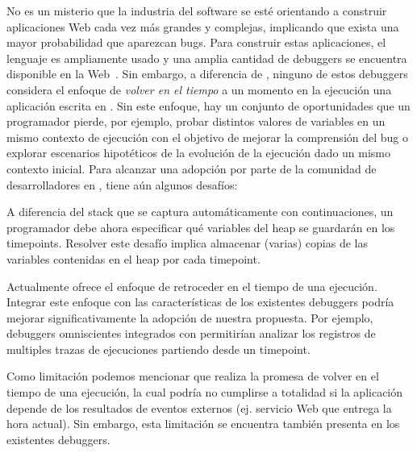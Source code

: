 \documentclass[conference]{IEEEtran}
\begin{document}
No es un misterio que la industria del software se est\'e orientando a construir aplicaciones Web cada vez m\'as grandes y complejas, implicando que exista una mayor probabilidad que aparezcan bugs. Para construir estas aplicaciones, el lenguaje \javascript es ampliamente usado y una amplia cantidad de debuggers se encuentra disponible en la Web~\cite{bartonOdvarko:www2011,jsbin,nodejsInspector,sessionstack,raygun,trackjs,azar:2016,barrAl:fse2016}. Sin embargo, a diferencia de \deloreanjs, ninguno de estos debuggers considera el enfoque de {\em volver en el tiempo} a un momento en la ejecuci\'on una aplicaci\'on escrita en \javascript. Sin este enfoque, hay un conjunto de oportunidades que un programador pierde, por ejemplo, probar distintos valores de variables en un mismo contexto de ejecuci\'on con el objetivo de mejorar la comprensi\'on del bug o explorar escenarios hipot\'eticos de la evoluci\'on de la ejecuci\'on dado un mismo contexto inicial. Para alcanzar una adopci\'on por parte de la comunidad de desarrolladores en \javascript, \deloreanjs tiene a\'un algunos desaf\'ios:  
   
\smallskip

 A diferencia del stack que se captura autom\'aticamente con continuaciones, un programador debe ahora especificar qu\'e variables del heap se guardar\'an en los timepoints. Resolver este desaf\'io implica almacenar (varias) copias de las variables contenidas en el heap por cada timepoint.      

\smallskip

 Actualmente \deloreanjs ofrece el enfoque de retroceder en el tiempo de una ejecuci\'on. Integrar este enfoque con las caracter\'isticas de los existentes debuggers podr\'ia mejorar significativamente la adopci\'on de nuestra propuesta. Por ejemplo, debuggers omniscientes integrados con \deloreanjs permitir\'ian analizar los registros de multiples trazas de ejecuciones partiendo desde un timepoint.

\smallskip

Como limitaci\'on podemos mencionar que \deloreanjs realiza la promesa de volver en el tiempo de una ejecuci\'on, la cual podr\'ia no cumplirse a totalidad si la aplicaci\'on depende de los resultados de eventos externos (ej. servicio Web que entrega la hora actual). Sin embargo, esta limitaci\'on se encuentra tambi\'en presenta en los existentes debuggers.               



\end{document}
